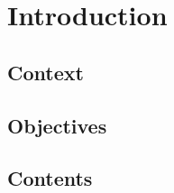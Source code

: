 \chapter{Introduction}
\label{chap:introduction}

\section{Context}

\section{Objectives}

\section{Contents}

